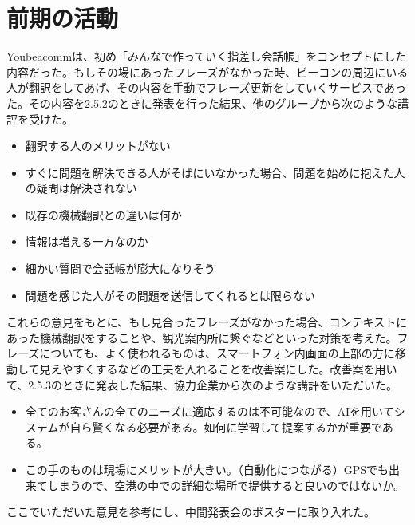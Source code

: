 \documentclass[11pt,papersize]{jsbook}
\begin{document}
\section{前期の活動}
  Youbeacommは、初め「みんなで作っていく指差し会話帳」をコンセプトにした内容だった。もしその場にあったフレーズがなかった時、ビーコンの周辺にいる人が翻訳をしてあげ、その内容を手動でフレーズ更新をしていくサービスであった。その内容を2.5.2のときに発表を行った結果、他のグループから次のような講評を受けた。
\begin{itemize}
\item 翻訳する人のメリットがない
\item すぐに問題を解決できる人がそばにいなかった場合、問題を始めに抱えた人の疑問は解決されない
\item 既存の機械翻訳との違いは何か
\item 情報は増える一方なのか
\item 細かい質問で会話帳が膨大になりそう
\item 問題を感じた人がその問題を送信してくれるとは限らない
\end{itemize}
これらの意見をもとに、もし見合ったフレーズがなかった場合、コンテキストにあった機械翻訳をすることや、観光案内所に繋ぐなどといった対策を考えた。フレーズについても、よく使われるものは、スマートフォン内画面の上部の方に移動して見えやすくするなどの工夫を入れることを改善案にした。改善案を用いて、2.5.3のときに発表した結果、協力企業から次のような講評をいただいた。
\begin{itemize}
\item 全てのお客さんの全てのニーズに適応するのは不可能なので、AIを用いてシステムが自ら賢くなる必要がある。如何に学習して提案するかが重要である。
\item この手のものは現場にメリットが大きい。（自動化につながる）GPSでも出来てしまうので、空港の中での詳細な場所で提供すると良いのではないか。
\end{itemize}
ここでいただいた意見を参考にし、中間発表会のポスターに取り入れた。
\end{document}
